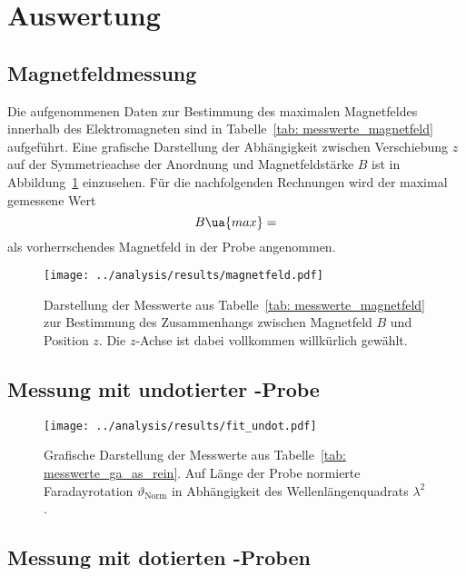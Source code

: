 \section{Auswertung}

\subsection{Magnetfeldmessung}
Die aufgenommenen Daten zur Bestimmung des maximalen Magnetfeldes innerhalb des Elektromagneten 
sind in Tabelle~\ref{tab: messwerte_magnetfeld} aufgeführt. Eine grafische Darstellung der Abhängigkeit zwischen Verschiebung 
$z$ auf der Symmetrieachse der Anordnung und Magnetfeldstärke $B$ ist in Abbildung~\ref{fig: magnetfeld} einzusehen. 
Für die nachfolgenden Rechnungen wird der maximal gemessene Wert 
\begin{equation}
    B\ua{max} = 
\end{equation}
als vorherrschendes Magnetfeld in der Probe angenommen. 

\begin{figure}
\centering
\texttt{[image: ../analysis/results/magnetfeld.pdf]}
\caption{Darstellung der Messwerte aus Tabelle~\ref{tab: messwerte_magnetfeld} zur Bestimmung des Zusammenhangs zwischen 
Magnetfeld $B$ und Position $z$. Die $z$-Achse ist dabei vollkommen willkürlich gewählt.}
\label{fig: magnetfeld}
\end{figure}






\subsection{Messung mit undotierter -Probe}



\begin{figure}
\centering
\texttt{[image: ../analysis/results/fit\_undot.pdf]}
\caption{Grafische Darstellung der Messwerte aus Tabelle~\ref{tab: messwerte_ga_as_rein}. Auf Länge der Probe normierte 
Faradayrotation $\vartheta_{\text{Norm}}$ in Abhängigkeit des Wellenlängenquadrats $\lambda^2$. }
\label{fig: ga_as_rein}
\end{figure}


\subsection{Messung mit dotierten -Proben}

